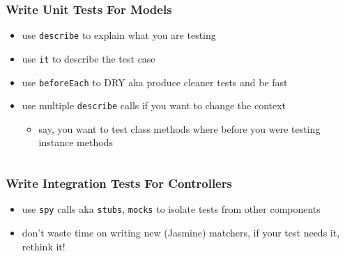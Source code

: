 \documentclass[compress]{beamer}
\begin{document}
\begin{frame}

\frametitle{Write Unit Tests For Models}

\begin{itemize}[<+->]
  \item use \texttt{describe} to explain what you are testing
  \item use \texttt{it} to describe the test case
  \item use \texttt{beforeEach} to DRY aka produce cleaner tests and be fast
  \item use multiple \texttt{describe} calls if you want to change the context
  \begin{itemize}[<+->]
    \item say, you want to test class methods where before you were testing instance methods
  \end{itemize}
\end{itemize}

\inputminted[fontsize=\tiny,gobble=2,linenos=true,firstline=3,lastline=23]{javascript}{code/js/app/test/model/article.js}

\end{frame}

\begin{frame}

\frametitle{Write Integration Tests For Controllers}

\begin{itemize}[<+->]
  \item use \texttt{spy} calls aka \texttt{stubs}, \texttt{mocks} to isolate tests from other components
  \item don't waste time on writing new (Jasmine) matchers, if your test needs it, rethink it!
\end{itemize}

\inputminted[fontsize=\tiny,gobble=2,linenos=true,firstline=6,lastline=29]{javascript}{code/js/app/test/controller/publish.js}

\end{frame}
\end{document}
